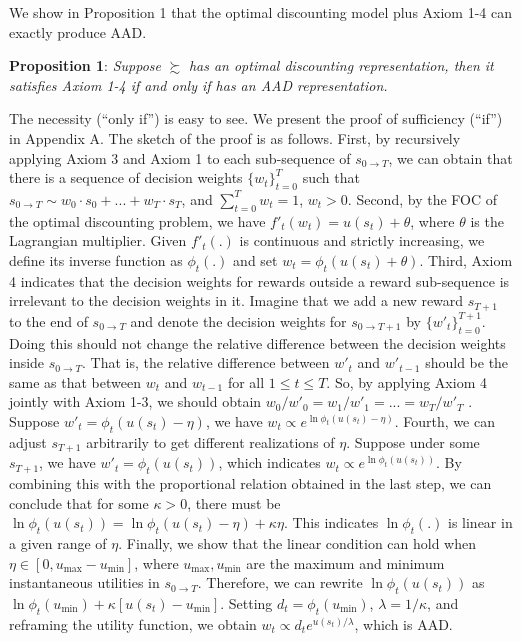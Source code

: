 \documentclass[
  12pt,
]{article}
\begin{document}
We show in Proposition 1 that the optimal discounting model plus Axiom
1-4 can exactly produce AAD.

\noindent \textbf{Proposition 1}: \emph{Suppose} \(\succsim\) \emph{has
an optimal discounting representation, then it satisfies Axiom 1-4 if
and only if has an AAD representation.}

The necessity (``only if'') is easy to see. We present the proof of
sufficiency (``if'') in Appendix A. The sketch of the proof is as
follows. First, by recursively applying Axiom 3 and Axiom 1 to each
sub-sequence of \(s_{0\rightarrow T}\), we can obtain that there is a
sequence of decision weights \(\{w_t\}_{t=0}^T\) such that
\(s_{0\rightarrow T}\sim w_0\cdot s_0+...+w_T\cdot s_T\), and
\(\sum_{t=0}^T w_t = 1\), \(w_t>0\). Second, by the FOC of the optimal
discounting problem, we have \(f'_t(w_t)=u(s_t)+\theta\), where
\(\theta\) is the Lagrangian multiplier. Given \(f'_t(.)\) is continuous
and strictly increasing, we define its inverse function as \(\phi_t(.)\)
and set \(w_t=\phi_t(u(s_t)+\theta)\). Third, Axiom 4 indicates that the
decision weights for rewards outside a reward sub-sequence is irrelevant
to the decision weights in it. Imagine that we add a new reward
\(s_{T+1}\) to the end of \(s_{0\rightarrow T}\) and denote the decision
weights for \(s_{0\rightarrow T+1}\) by \(\{w'_t\}_{t=0}^{T+1}\). Doing
this should not change the relative difference between the decision
weights inside \(s_{0\rightarrow T}\). That is, the relative difference
between \(w'_t\) and \(w'_{t-1}\) should be the same as that between
\(w_t\) and \(w_{t-1}\) for all \(1\leq t\leq T\). So, by applying Axiom
4 jointly with Axiom 1-3, we should obtain
\(w_0/w'_0=w_1/w'_1=...=w_T/w'_T\) . Suppose
\(w'_t=\phi_t(u(s_t)-\eta)\), we have
\(w_t \propto e^{\ln\phi_t(u(s_t)-\eta)}\). Fourth, we can adjust
\(s_{T+1}\) arbitrarily to get different realizations of \(\eta\).
Suppose under some \(s_{T+1}\), we have \(w'_t = \phi_t(u(s_t))\), which
indicates \(w_t \propto e^{\ln\phi_t(u(s_t))}\). By combining this with
the proportional relation obtained in the last step, we can conclude
that for some \(\kappa>0\), there must be
\(\ln\phi_t(u(s_t))=\ln\phi_t(u(s_t)-\eta)+\kappa\eta\). This indicates
\(\ln \phi_t(.)\) is linear in a given range of \(\eta\). Finally, we
show that the linear condition can hold when
\(\eta\in[0,u_{\max}-u_{\min}]\), where \(u_{\max},u_{\min}\) are the
maximum and minimum instantaneous utilities in \(s_{0\rightarrow T}\).
Therefore, we can rewrite \(\ln\phi_t(u(s_t))\) as
\(\ln\phi_t(u_{\min})+\kappa[u(s_t)-u_{\min}]\). Setting
\(d_t=\phi_t(u_{\min})\), \(\lambda =1/\kappa\), and reframing the
utility function, we obtain \(w_t \propto d_t e^{u(s_t)/\lambda}\),
which is AAD.
\end{document}
